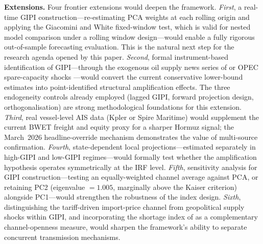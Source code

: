 \documentclass[12pt]{article}
\begin{document}
\noindent\textbf{Extensions.}
Four frontier extensions would deepen the framework.
\textit{First}, a real-time GIPI construction---re-estimating PCA
weights at each rolling origin and applying the Giacomini and White
\citeyear{giacomini2006} fixed-window test, which is valid for nested
model comparison under a rolling window design---would enable a fully
rigorous out-of-sample forecasting evaluation.
This is the natural next step for the research agenda opened by this paper.
\textit{Second}, formal instrument-based identification of GIPI---through
the exogenous oil supply news series of \citet{baumeister2019} or OPEC
spare-capacity shocks \citep{caldara2022}---would convert the current
conservative lower-bound estimates into point-identified structural
amplification effects.
The three endogeneity controls already employed (lagged GIPI, forward
projection design, orthogonalisation) are strong methodological
foundations for this extension.
\textit{Third}, real vessel-level AIS data (Kpler or Spire Maritime)
would supplement the current BWET freight and equity proxy for a
sharper Hormuz signal; the March~2026 headline-override mechanism
demonstrates the value of multi-source confirmation.
\textit{Fourth}, state-dependent local projections---estimated separately
in high-GIPI and low-GIPI regimes---would formally test whether the
amplification hypothesis operates symmetrically at the IRF level.
\textit{Fifth}, sensitivity analysis for GIPI construction---testing
an equally-weighted channel average against PCA, or retaining PC2
(eigenvalue $= 1.005$, marginally above the Kaiser criterion) alongside
PC1---would strengthen the robustness of the index design.
\textit{Sixth}, distinguishing the tariff-driven import-price channel
from geopolitical supply shocks within GIPI, and incorporating
the shortage index of \citet{caldara2025shortages} as a complementary
channel-openness measure, would sharpen the framework's ability
to separate concurrent transmission mechanisms.

\newpage
\end{document}
